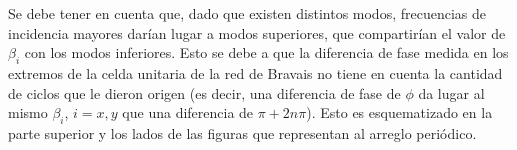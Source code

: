 Se debe tener en cuenta que, dado que existen distintos modos, frecuencias de incidencia mayores darían lugar a modos superiores, que compartirían el valor de $\beta_i$ con los modos inferiores. Esto se debe a que la diferencia de fase medida en los extremos de la celda unitaria de la red de Bravais no tiene en cuenta la cantidad de ciclos que le dieron origen (es decir, una diferencia de fase de $\phi$ da lugar al mismo $\beta_i$, $i=x,y$ que una diferencia de $\pi+2 n \pi$). Esto es esquematizado en la parte superior y los lados de las figuras que representan al arreglo periódico.

